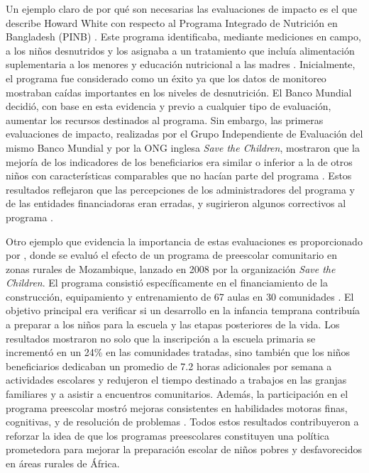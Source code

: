 \documentclass[../../main.tex]{subfiles}
\begin{document}
Un ejemplo claro de por qué son necesarias las evaluaciones de impacto es el que describe
Howard White con respecto al Programa Integrado de Nutrición en Bangladesh (PINB)
\cite{white2009theory}. Este programa identificaba, mediante mediciones en campo, a los
niños desnutridos y los asignaba a un tratamiento que incluía alimentación suplementaria a
los menores y educación nutricional a las madres \cite{bernal}. Inicialmente, el programa
fue considerado como un éxito ya que los datos de monitoreo mostraban caídas importantes
en los niveles de desnutrición. El Banco Mundial decidió, con base en esta evidencia y
previo a cualquier tipo de evaluación, aumentar los recursos destinados al programa. Sin
embargo, las primeras evaluaciones de impacto, realizadas por el Grupo Independiente de
Evaluación del mismo Banco Mundial y por la ONG inglesa \textit{Save the Children},
mostraron que la mejoría de los indicadores de los beneficiarios era similar o inferior a
la de otros niños con características comparables que no hacían parte del programa
\cite{bernal}. Estos resultados reflejaron que las percepciones de los administradores del
programa y de las entidades financiadoras eran erradas, y sugirieron algunos correctivos
al programa \cite{bernal}.

Otro ejemplo que evidencia la importancia de estas evaluaciones es proporcionado por
\cite{preschool-africa-2012}, donde se evaluó el efecto de un programa de preescolar
comunitario en zonas rurales de Mozambique, lanzado en 2008 por la organización \textit{Save the
Children}. El programa consistió específicamente en el financiamiento de la construcción,
equipamiento y entrenamiento de 67 aulas en 30 comunidades \cite{preschool-africa-2012}. El
objetivo principal era verificar si un desarrollo en la infancia temprana contribuía a
preparar a los niños para la escuela y las etapas posteriores de la vida. Los resultados
mostraron no solo que la inscripción a la escuela primaria se incrementó en un 24\% en las
comunidades tratadas, sino también que los niños beneficiarios dedicaban un promedio de
7.2 horas adicionales por semana a actividades escolares y redujeron el tiempo destinado a
trabajos en las granjas familiares y a asistir a encuentros comunitarios. Además, la
participación en el programa preescolar mostró mejoras consistentes en habilidades motoras
finas, cognitivas, y de resolución de problemas \cite{preschool-africa-2012}. Todos estos
resultados contribuyeron a reforzar la idea de que los programas preescolares constituyen
una política prometedora para mejorar la preparación escolar de niños pobres y
desfavorecidos en áreas rurales de África.
\end{document}
